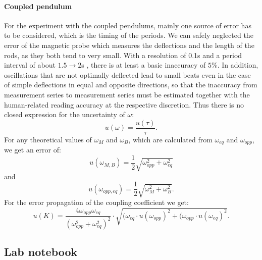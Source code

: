 \documentclass{article}
\begin{document}
\paragraph{Coupled pendulum}
For the experiment with the coupled pendulums, mainly one source of error has to be considered, which is the timing of the periods. We can safely neglected the error of the magnetic probe which measures the deflections and the length of the rods, as they both tend to very small. With a resolution of 0.1s and a period interval of about $1.5\rightarrow 2$s , there is at least a basic inaccuracy of $5\%$. In addition, oscillations that are not optimally deflected lead to small beats even in the case of simple deflections in equal and opposite directions, so that the inaccuracy from measurement series to measurement series must be estimated together with the human-related reading accuracy at the respective discretion. Thus there is no closed expression for the uncertainty of $\omega$:
\begin{equation}
u(\omega)= \frac{u(\tau)}{\tau}.
\end{equation}
For any theoretical values of $\omega_M$ and $\omega_B$, which are calculated from $\omega_{eq}$ and $\omega_{opp}$, we get an error of:
\begin{equation}
u(\omega_{M,B})= \frac{1}{2} \sqrt{\omega_{opp}^2+ \omega_{eq}^2}
\end{equation}
and
\begin{equation}
u(\omega_{opp,eq})= \frac{1}{2} \sqrt{\omega_{M}^2+ \omega_{B}^2}.
\end{equation}
For the error propagation of the coupling coefficient we get:
\begin{equation}
u(K)= \frac{4 \omega_{opp}\omega_{eq}}{(\omega_{opp}^2+\omega_{eq}^2)^2} \cdot \sqrt{(\omega_{eq} \cdot u(\omega_{opp})^2 + (\omega_{opp} \cdot u(\omega_{eq})^2}.
\end{equation}


\subsection{Lab notebook}
\end{document}
